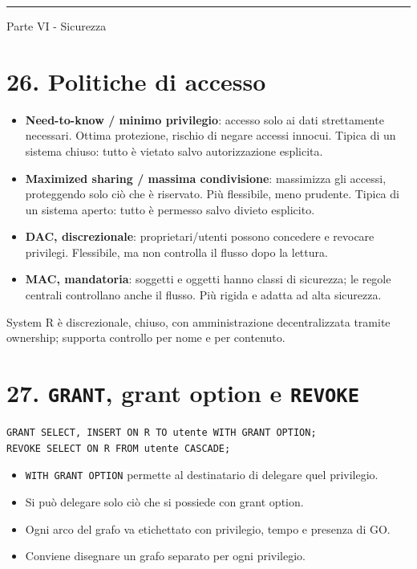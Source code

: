\documentclass[
  10pt,
  a4paper,
]{article}
\providecommand{\tightlist}{%
  \setlength{\itemsep}{0pt}\setlength{\parskip}{0pt}}
\begin{document}
\begin{center}\rule{0.5\linewidth}{0.5pt}\end{center}

Parte VI - Sicurezza

\section{26. Politiche di accesso}\label{26-politiche-di-accesso}

\begin{itemize}
\tightlist
\item
  \textbf{Need-to-know / minimo privilegio}: accesso solo ai dati
  strettamente necessari. Ottima protezione, rischio di negare accessi
  innocui. Tipica di un sistema chiuso: tutto è vietato salvo
  autorizzazione esplicita.
\item
  \textbf{Maximized sharing / massima condivisione}: massimizza gli
  accessi, proteggendo solo ciò che è riservato. Più flessibile, meno
  prudente. Tipica di un sistema aperto: tutto è permesso salvo divieto
  esplicito.
\item
  \textbf{DAC, discrezionale}: proprietari/utenti possono concedere e
  revocare privilegi. Flessibile, ma non controlla il flusso dopo la
  lettura.
\item
  \textbf{MAC, mandatoria}: soggetti e oggetti hanno classi di
  sicurezza; le regole centrali controllano anche il flusso. Più rigida
  e adatta ad alta sicurezza.
\end{itemize}

System R è discrezionale, chiuso, con amministrazione decentralizzata
tramite ownership; supporta controllo per nome e per contenuto.

\section{\texorpdfstring{27. \texttt{GRANT}, grant option e
\texttt{REVOKE}}{27. GRANT, grant option e REVOKE}}\label{27-grant-grant-option-e-revoke}

\begin{verbatim}
GRANT SELECT, INSERT ON R TO utente WITH GRANT OPTION;
REVOKE SELECT ON R FROM utente CASCADE;
\end{verbatim}

\begin{itemize}
\tightlist
\item
  \texttt{WITH\ GRANT\ OPTION} permette al destinatario di delegare quel
  privilegio.
\item
  Si può delegare solo ciò che si possiede con grant option.
\item
  Ogni arco del grafo va etichettato con privilegio, tempo e presenza di
  GO.
\item
  Conviene disegnare un grafo separato per ogni privilegio.
\end{itemize}
\end{document}
